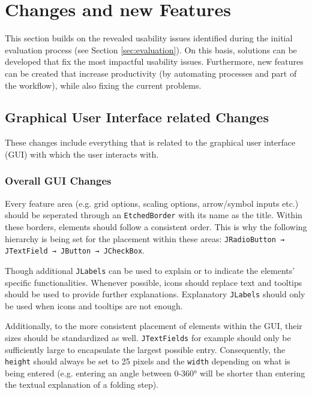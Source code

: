 
\section{Changes and new Features}
\label{sec:solutions}

This section builds on the revealed usability issues identified during the initial evaluation process (see Section \ref{sec:evaluation}). On this basis, solutions can be developed that fix the most impactful usability issues. Furthermore, new features can be created that increase productivity (by automating processes and part of the workflow), while also fixing the current problems.

\subsection{Graphical User Interface related Changes}

These changes include everything that is related to the graphical user interface (GUI) with which the user interacts with.

\subsubsection{Overall GUI Changes}
Every feature area (e.g. grid options, scaling options, arrow/symbol inputs etc.) should be seperated through an \texttt{EtchedBorder} with its name as the title. Within these borders, elements should follow a consistent order. This is why the following hierarchy is being set for the placement within these areas: \texttt{JRadioButton → JTextField → JButton → JCheckBox}.

Though additional \texttt{JLabels} can be used to explain or to indicate the elements' specific functionalities. Whenever possible, icons should replace text and tooltips should be used to provide further explanations. Explanatory \texttt{JLabels} should only be used when icons and tooltips are not enough.

Additionally, to the more consistent placement of elements within the GUI, their sizes should be standardized as well. \texttt{JTextFields} for example should only be sufficiently large to encapsulate the largest possible entry. Consequently, the \texttt{height} should always be set to 25 pixels and the \texttt{width} depending on what is being entered (e.g. entering an angle between 0-360° will be shorter than entering the textual explanation of a folding step).

